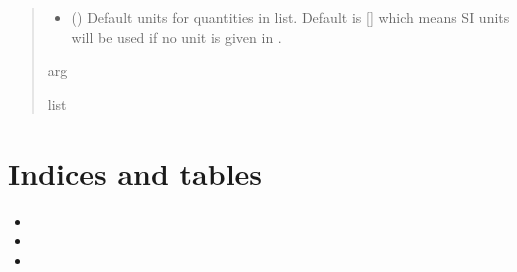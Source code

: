\documentclass[letterpaper,10pt,english]{sphinxmanual}
\begin{document}
\begin{fulllineitems}
\begin{quote}
\begin{description}
\begin{itemize}
\item {}
\sphinxAtStartPar
{} (\sphinxstyleliteralemphasis{\sphinxupquote{, }}) \textendash{} Default units for quantities in  list. Default is {[}{]} which means SI units will be used if no unit is given in .

\end{itemize}

\sphinxAtStartPar
arg

\sphinxAtStartPar
list

\end{description}\end{quote}

\end{fulllineitems}


\begin{fulllineitems}
\label{\detokenize{components:components.thermal_conductance_of_via_farm_view}}
\pysigstartsignatures
{}
\pysigstopsignatures
\end{fulllineitems}



\chapter{Indices and tables}
\label{\detokenize{index:indices-and-tables}}\begin{itemize}
\item {}
\sphinxAtStartPar
{}

\item {}
\sphinxAtStartPar
{}

\item {}
\sphinxAtStartPar
{}

\end{itemize}


\renewcommand{\indexname}{Python Module Index}
\begin{sphinxtheindex}
\let\bigletter\sphinxstyleindexlettergroup
\bigletter{c}
\item\relax{}
\indexspace
\bigletter{t}
\item\relax{}
\end{sphinxtheindex}

\renewcommand{\indexname}{Index}
\printindex
\end{document}
